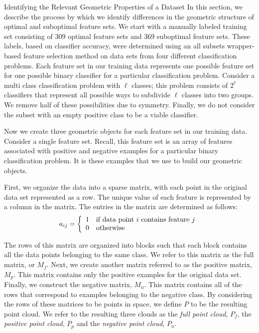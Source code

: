 \documentclass{llncs}
\begin{document}
\begin{section}{Identifying the Relevant Geometric Properties of a Dataset}
In this section, we describe the process by which we identify differences in the geometric structure of optimal and suboptimal feature sets.
We start with a manually labeled training set consisting of 309 optimal feature sets and 369 suboptimal feature sets. These labels, based on classifier accuracy, were determined using an all subsets wrapper-based feature selection method on data sets from four different classification problems. Each feature set in our training data represents one possible feature set for one possible binary classifier for a particular classification problem. Consider a multi class classification problem with $\ell$ classes; this problem consists of $2^{\ell}$ classifiers that represent all possible ways to subdivide $\ell$ classes into two groups. We remove half of these possibilities due to symmetry. Finally, we do not consider the subset with an empty positive class to be a viable classifier. 

Now we create three geometric objects for each feature set in our training data. Consider a single feature set. Recall, this feature set is an array of features associated with positive and negative examples for a particular binary classification problem. It is these examples that we use to build our geometric objects.

First, we organize the data into a sparse matrix, with each point in the original data set represented as a row. The unique value of each feature is represented by a column in the matrix. The entries in the matrix are determined as follows:
$$a_{ij} =\left\{
\begin{array}{c l}     
    1 & \text{if data point $i$ contains feature $j$}\\
    0 & \text{otherwise}
\end{array}\right.$$

The rows of this matrix are organized into blocks such that each block contains all the data points belonging to the same class. We refer to this matrix as the full matrix, or $M_f$. Next, we create another matrix referred to as the positive matrix, $M_p$. This matrix contains only the positive examples for the original data set. Finally, we construct the negative matrix, $M_n$. This matrix contains all of the rows that correspond to examples belonging to the negative class. By considering the rows of these matrices to be points in space, we define $P$ to be the resulting point cloud. We refer to the resulting three clouds as the {\em full point cloud}, $P_f$, the {\em positive point cloud}, $P_p$ and the {\em negative point cloud}, $P_n$. 



\end{section}
\end{document}
